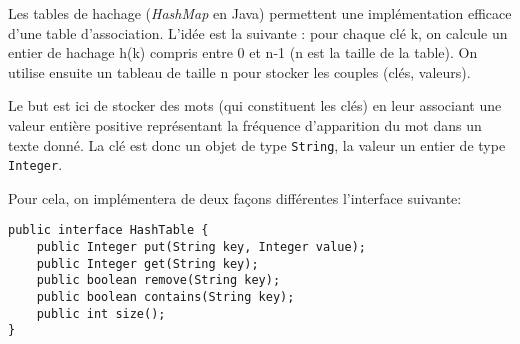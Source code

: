 \documentclass[iutinfo,a4paper,nocorrections,10pt]{ustl-tdtp}
\date{\annee{2018}--\annee{2019}}
\begin{document}
\maketitle
\thispagestyle{empty}

Les tables de hachage (\textit{HashMap} en Java) permettent une implémentation efficace d'une table d'association. L'idée est la suivante : pour chaque clé k, on calcule un entier de hachage h(k) compris entre 0 et n-1 (n est la taille de la table). On utilise ensuite un tableau de taille n pour stocker les couples (clés, valeurs).

Le but est ici de stocker des mots (qui constituent les clés) en leur associant une valeur entière positive représentant la fréquence d'apparition du mot dans un texte donné. La clé est donc un objet de type \texttt{String}, la valeur un entier de type \texttt{Integer}.

Pour cela, on implémentera de deux façons différentes l'interface suivante:


\begin{verbatim}
public interface HashTable {
    public Integer put(String key, Integer value);
    public Integer get(String key);
    public boolean remove(String key);
    public boolean contains(String key);
    public int size();
}
\end{verbatim}

 \\

 \\

\end{document}
